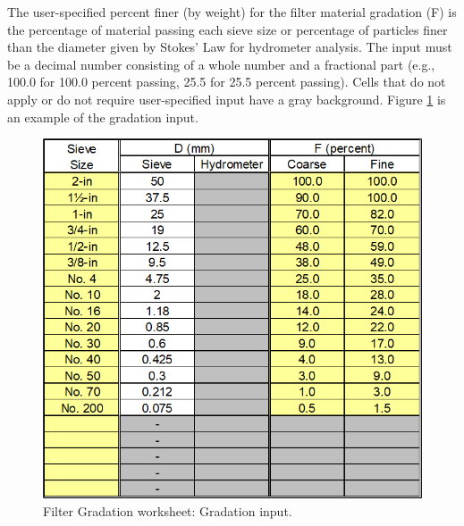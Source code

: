 \documentclass[
]{book}
\begin{document}
The user-specified percent finer (by weight) for the filter material gradation (F) is the percentage of material passing each sieve size or percentage of particles finer than the diameter given by Stokes' Law for hydrometer analysis. The input must be a decimal number consisting of a whole number and a fractional part (e.g., 100.0 for 100.0 percent passing, 25.5 for 25.5 percent passing). Cells that do not apply or do not require user-specified input have a gray background. Figure \ref{fig:figure-9} is an example of the gradation input.

\begin{figure}

{\centering \includegraphics[width=1\linewidth]{images/figure9} 

}

\caption{Filter Gradation worksheet: Gradation input.}\label{fig:figure-9}
\end{figure}

  
\end{document}
